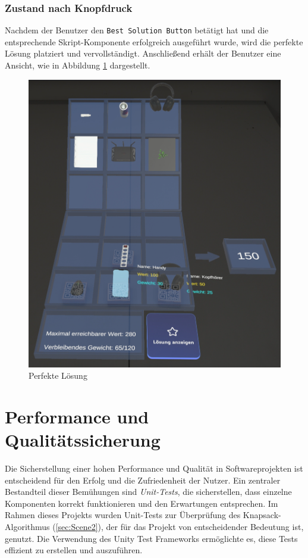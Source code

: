 \begin{itemize}
\subsubsection{Zustand nach Knopfdruck}
Nachdem der Benutzer den \texttt{Best Solution Button} betätigt hat und die entsprechende Skript-Komponente erfolgreich
ausgeführt wurde, wird die perfekte Lösung platziert und vervollständigt. Anschließend erhält der Benutzer eine Ansicht,
wie in Abbildung \ref{fig:perfSolUserPOV} dargestellt.
\begin{figure}[H]
    \centering
    \includegraphics[width=\textwidth]{images/perfSolUserPOV}
    \caption{Perfekte Lösung}
    \label{fig:perfSolUserPOV}
\end{figure}


\section{Performance und Qualitätssicherung} 

Die Sicherstellung einer hohen Performance und Qualität in Softwareprojekten ist entscheidend für den Erfolg und die Zufriedenheit der Nutzer. Ein zentraler Bestandteil dieser Bemühungen sind \textit{Unit-Tests}, die sicherstellen, dass einzelne Komponenten korrekt funktionieren und den Erwartungen entsprechen. Im Rahmen dieses Projekts wurden Unit-Tests zur Überprüfung des Knapsack-Algorithmus (\ref{sec:Scene2}), der für das Projekt von entscheidender Bedeutung ist, genutzt. Die Verwendung des Unity Test Frameworks ermöglichte es, diese Tests effizient zu erstellen und auszuführen.


\end{itemize}
